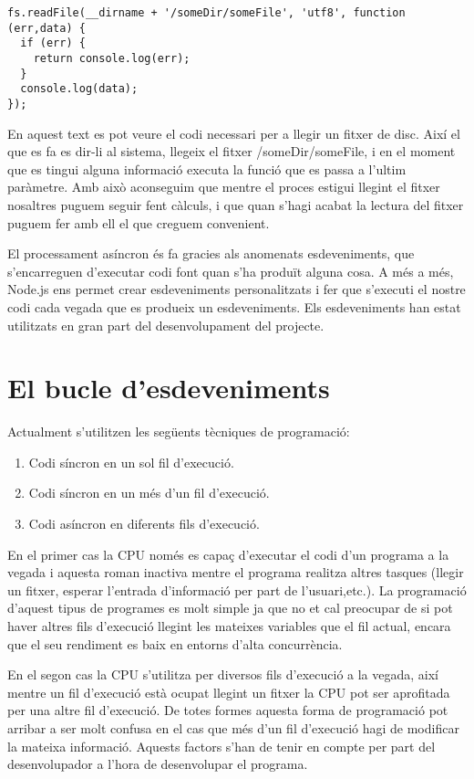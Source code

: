 \begin{lstlisting}
fs.readFile(__dirname + '/someDir/someFile', 'utf8', function (err,data) {
  if (err) {
    return console.log(err);
  }
  console.log(data);
});
\end{lstlisting}

En aquest text es pot veure el codi necessari per a llegir un fitxer de disc. Així el que es fa es dir-li al sistema, llegeix el fitxer /someDir/someFile, i en el moment que es tingui alguna informació executa la funció que es passa a l'ultim paràmetre. Amb això aconseguim que mentre el proces estigui llegint el fitxer nosaltres puguem seguir fent càlculs, i que quan s'hagi acabat la lectura del fitxer puguem fer amb ell el que creguem convenient. 

El processament asíncron és fa gracies als anomenats esdeveniments, que s'encarreguen d'executar codi font quan s'ha produït alguna cosa. A més a més, Node.js ens permet crear esdeveniments personalitzats i fer que s'executi el nostre codi cada vegada que es produeix un esdeveniments. Els esdeveniments han estat utilitzats en gran part del desenvolupament del projecte. 

\section{El bucle d'esdeveniments}

Actualment s'utilitzen les següents tècniques de programació: 

\begin{enumerate}
    \item{Codi síncron en un sol fil d'execució.}
    \item{Codi síncron en un més d'un fil d'execució.}
    \item{Codi asíncron en diferents fils d'execució.}
\end{enumerate}

En el primer cas la CPU només es capaç d'executar el codi d'un programa a la vegada i aquesta roman inactiva mentre el programa realitza altres tasques (llegir un fitxer, esperar l'entrada d'informació per part de l'usuari,etc.). La programació d'aquest tipus de programes es molt simple ja que no et cal preocupar de si pot haver altres fils d'execució llegint les mateixes variables que el fil actual, encara que el seu rendiment es baix en entorns d'alta concurrència. 

En el segon cas la CPU s'utilitza per diversos fils d'execució a la vegada, així mentre un fil d'execució està ocupat llegint un fitxer la CPU pot ser aprofitada per una altre fil d'execució. De totes formes aquesta forma de programació pot arribar a ser molt confusa en el cas que més d'un fil d'execució hagi de modificar la mateixa informació. Aquests factors s'han de tenir en compte per part del desenvolupador a l'hora de desenvolupar el programa. 

